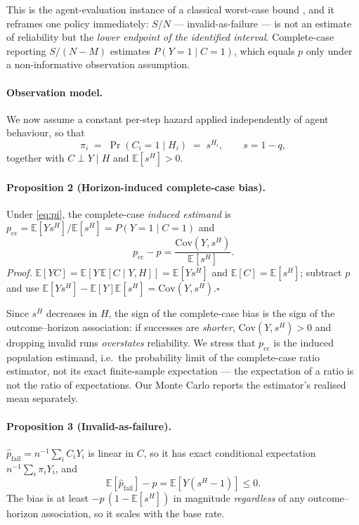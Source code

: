 \documentclass[letterpaper]{article}
\begin{document}
This is the agent-evaluation instance of a classical worst-case bound
\citep{manski1990nonparametric}, and it reframes one policy immediately:
$S/N$ --- invalid-as-failure --- is not an estimate of reliability but the
\emph{lower endpoint of the identified interval}. Complete-case reporting
$S/(N-M)$ estimates $P(Y=1\mid C=1)$, which equals $p$ only under a
non-informative observation assumption.

\paragraph{Observation model.} We now assume a constant per-step hazard applied
independently of agent behaviour, so that
\begin{equation}
\pi_i \;=\; \Pr(C_i=1\mid H_i)\;=\;s^{H_i},\qquad s=1-q,
\label{eq:pi}
\end{equation}
together with $C\perp Y\mid H$ and $\mathbb{E}[s^{H}]>0$.

\paragraph{Proposition 2 (Horizon-induced complete-case bias).}
Under \eqref{eq:pi}, the complete-case \emph{induced estimand} is
$p_{\mathrm{cc}}=\mathbb{E}[Ys^{H}]/\mathbb{E}[s^{H}]=P(Y{=}1\mid C{=}1)$ and
\begin{equation}
p_{\mathrm{cc}}-p=\frac{\mathrm{Cov}(Y,s^{H})}{\mathbb{E}[s^{H}]} .
\label{eq:cc}
\end{equation}
\emph{Proof.} $\mathbb{E}[YC]=\mathbb{E}[Y\,\mathbb{E}[C\mid Y,H]]=\mathbb{E}[Ys^{H}]$
and $\mathbb{E}[C]=\mathbb{E}[s^{H}]$; subtract $p$ and use
$\mathbb{E}[Ys^{H}]-\mathbb{E}[Y]\mathbb{E}[s^{H}]=\mathrm{Cov}(Y,s^{H})$.\hfill$\square$

Since $s^{H}$ decreases in $H$, the sign of the complete-case bias is the sign
of the outcome--horizon association: if successes are \emph{shorter},
$\mathrm{Cov}(Y,s^{H})>0$ and dropping invalid runs \emph{overstates}
reliability. We stress that $p_{\mathrm{cc}}$ is the induced population
estimand, i.e.\ the probability limit of the complete-case ratio estimator, not
its exact finite-sample expectation --- the expectation of a ratio is not the
ratio of expectations. Our Monte Carlo reports the estimator's realised mean
separately.

\paragraph{Proposition 3 (Invalid-as-failure).}
$\hat p_{\mathrm{fail}}=n^{-1}\sum_i C_iY_i$ is linear in $C$, so it has exact
conditional expectation $n^{-1}\sum_i \pi_i Y_i$, and
\begin{equation}
\mathbb{E}[\hat p_{\mathrm{fail}}]-p=\mathbb{E}\!\left[Y(s^{H}-1)\right]\le 0 .
\label{eq:fail}
\end{equation}
The bias is at least $-p\,(1-\mathbb{E}[s^{H}])$ in magnitude \emph{regardless}
of any outcome--horizon association, so it scales with the base rate.
\end{document}
